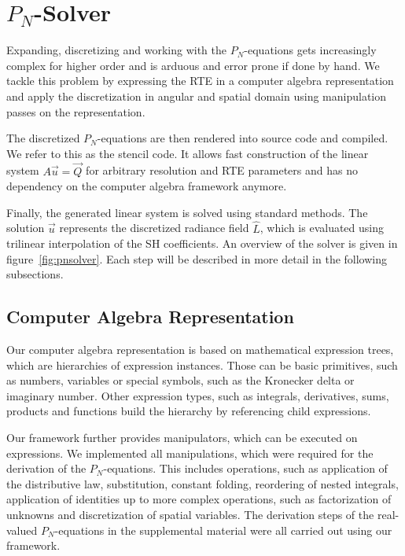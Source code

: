 

\section{$P_N$-Solver}
\label{sec:pnsolver}



Expanding, discretizing and working with the $P_N$-equations gets increasingly complex for higher order and is arduous and error prone if done by hand. We tackle this problem by expressing the RTE in a computer algebra representation and apply the discretization in angular and spatial domain using manipulation passes on the representation.

The discretized $P_N$-equations are then rendered into source code and compiled. We refer to this as the stencil code. It allows fast construction of the linear system $A\vec{u}=\vec{Q}$ for arbitrary resolution and RTE parameters and has no dependency on the computer algebra framework anymore.

Finally, the generated linear system is solved using standard methods. The solution $\vec{u}$ represents the discretized radiance field $\widehat{L}$, which is evaluated using trilinear interpolation of the SH coefficients. An overview of the solver is given in figure~\ref{fig:pnsolver}. Each step will be described in more detail in the following subsections.

\subsection{Computer Algebra Representation}

Our computer algebra representation is based on mathematical expression trees, which are hierarchies of expression instances. Those can be basic primitives, such as numbers, variables or special symbols, such as the Kronecker delta or imaginary number. Other expression types, such as integrals, derivatives, sums, products and functions build the hierarchy by referencing child expressions.

Our framework further provides manipulators, which can be executed on expressions. We implemented all manipulations, which were required for the derivation of the $P_N$-equations. This includes operations, such as application of the distributive law, substitution, constant folding, reordering of nested integrals, application of identities up to more complex operations, such as factorization of unknowns and discretization of spatial variables. The derivation steps of the real-valued $P_N$-equations in the supplemental material were all carried out using our framework.

